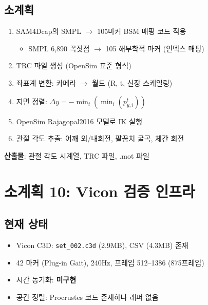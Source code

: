 \documentclass[11pt, a4paper]{report}
\begin{document}
\subsection{소계획}
\begin{pipelinebox}[title={SP-9: SMPL $\to$ OpenSim 생체역학 브릿지}]
\begin{enumerate}
\item SAM4Dcap의 SMPL $\to$ 105마커 BSM 매핑 코드 적용
  \begin{itemize}
  \item SMPL 6,890 꼭짓점 $\to$ 105 해부학적 마커 (인덱스 매핑)
  \end{itemize}
\item TRC 파일 생성 (OpenSim 표준 형식)
\item 좌표계 변환: 카메라 $\to$ 월드 (R, t, 신장 스케일링)
\item 지면 정렬: $\Delta y = -\min_t(\min_i(p_{y,i}^t))$
\item OpenSim Rajagopal2016 모델로 IK 실행
\item 관절 각도 추출: 어깨 외/내회전, 팔꿈치 굴곡, 체간 회전
\end{enumerate}
\textbf{산출물}: 관절 각도 시계열, TRC 파일, .mot 파일
\end{pipelinebox}


\section{소계획 10: Vicon 검증 인프라}
\label{sec:sp10}

\subsection{현재 상태}
\begin{itemize}
\item Vicon C3D: \texttt{set\_002.c3d} (2.9MB), CSV (4.3MB) 존재
\item 42 마커 (Plug-in Gait), 240Hz, 프레임 512--1386 (875프레임)
\item 시간 동기화: \textbf{미구현}
\item 공간 정렬: Procrustes 코드 존재하나 래퍼 없음
\end{itemize}
\end{document}
